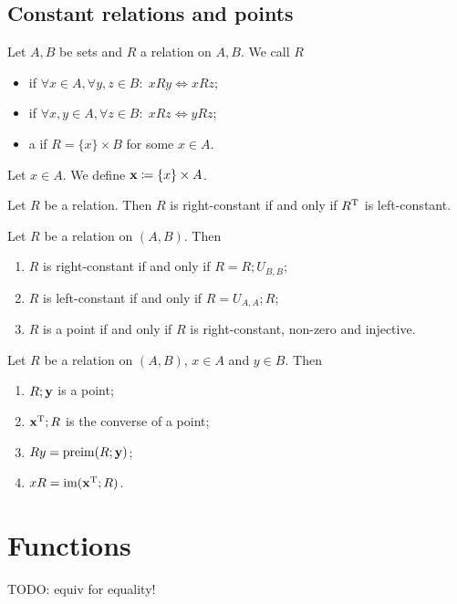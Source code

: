 \subsection{Constant relations and points}
\begin{definition}
Let $A,B$ be sets and $R$ a relation on $A,B$. We call $R$
\begin{itemize}
\item {} if $\forall x\in A, \forall y,z \in B: \; xRy \iff xRz$;
\item {} if $\forall x, y\in A, \forall z \in B: \; xRz \iff yRz$;
\item a  if $R = \{x\}\times B$ for some $x\in A$.
\end{itemize}
Let $x\in A$. We define $\point{x} \defeq \{x\}\times A$.
\end{definition}

\begin{lemma}
Let $R$ be a relation. Then $R$ is right-constant \textup{if and only if} $R^{\mathrm{T}}$ is left-constant.
\end{lemma}

\begin{lemma}
Let $R$ be a relation on $(A, B)$. Then
\begin{enumerate}
\item $R$ is right-constant \textup{if and only if} $R = R;U_{B,B}$;
\item $R$ is left-constant \textup{if and only if} $R = U_{A,A};R$;
\item $R$ is a point \textup{if and only if} $R$ is right-constant, non-zero and injective.
\end{enumerate}
\end{lemma}

\begin{lemma}
Let $R$ be a relation on $(A,B)$, $x\in A$ and $y\in B$. Then
\begin{enumerate}
\item $R;\point{y}$ is a point;
\item $\point{x}^\transp; R$ is the converse of a point;
\item $Ry = \preim(R;\point{y})$;
\item $xR = \im(\point{x}^\transp; R)$.
\end{enumerate}
\end{lemma}

\section{Functions}
TODO: equiv for equality!

